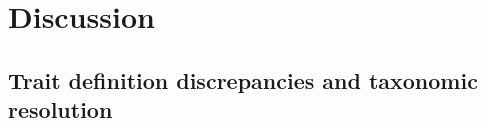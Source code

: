 \documentclass{article}
\begin{document}
\newpage


\section*{Discussion}


\subsection*{Trait definition discrepancies and taxonomic resolution}
\end{document}
